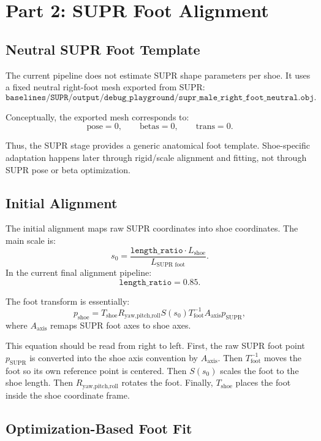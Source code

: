 \documentclass[11pt]{article}
\begin{document}
\section{Part 2: SUPR Foot Alignment}

\subsection{Neutral SUPR Foot Template}

The current pipeline does not estimate SUPR shape parameters per shoe.  It uses
a fixed neutral right-foot mesh exported from SUPR:
\[
\texttt{baselines/SUPR/output/debug\_playground/supr\_male\_right\_foot\_neutral.obj}.
\]

Conceptually, the exported mesh corresponds to:
\[
\text{pose}=0,\qquad \text{betas}=0,\qquad \text{trans}=0.
\]

Thus, the SUPR stage provides a generic anatomical foot template.  Shoe-specific
adaptation happens later through rigid/scale alignment and fitting, not through
SUPR pose or beta optimization.

\subsection{Initial Alignment}

The initial alignment maps raw SUPR coordinates into shoe coordinates.  The
main scale is:
\[
s_0 =
\frac{\texttt{length\_ratio}\cdot L_{\text{shoe}}}
     {L_{\text{SUPR foot}}}.
\]
In the current final alignment pipeline:
\[
\texttt{length\_ratio}=0.85.
\]

The foot transform is essentially:
\[
p_{\text{shoe}}
=
T_{\text{shoe}}
R_{\text{yaw,pitch,roll}}
S(s_0)
T_{\text{foot}}^{-1}
A_{\text{axis}}
p_{\text{SUPR}},
\]
where \(A_{\text{axis}}\) remaps SUPR foot axes to shoe axes.

This equation should be read from right to left.  First, the raw SUPR foot
point \(p_{\text{SUPR}}\) is converted into the shoe axis convention by
\(A_{\text{axis}}\).  Then \(T_{\text{foot}}^{-1}\) moves the foot so its own
reference point is centered.  Then \(S(s_0)\) scales the foot to the shoe
length.  Then \(R_{\text{yaw,pitch,roll}}\) rotates the foot.  Finally,
\(T_{\text{shoe}}\) places the foot inside the shoe coordinate frame.

\subsection{Optimization-Based Foot Fit}
\end{document}
